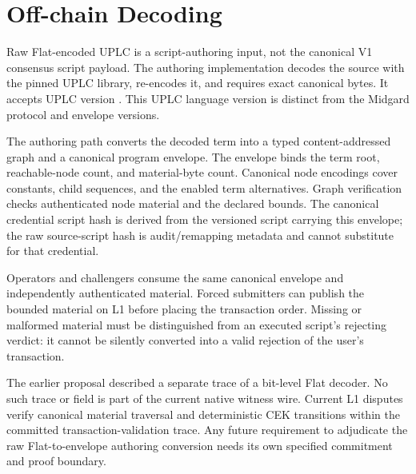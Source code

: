 \documentclass[../midgard.tex]{subfiles}
\begin{document}
\section{Off-chain Decoding}
\label{s:phase-two-decoding-off-chain}

Raw Flat-encoded UPLC is a script-authoring input, not the canonical V1 consensus script payload. The authoring implementation decodes the source with the pinned UPLC library, re-encodes it, and requires exact canonical bytes. It accepts UPLC version . This UPLC language version is distinct from the Midgard protocol and envelope versions.

The authoring path converts the decoded term into a typed content-addressed graph and a canonical program envelope. The envelope binds the term root, reachable-node count, and material-byte count. Canonical node encodings cover constants, child sequences, and the enabled term alternatives. Graph verification checks authenticated node material and the declared bounds. The canonical credential script hash is derived from the versioned script carrying this envelope; the raw source-script hash is audit/remapping metadata and cannot substitute for that credential.

Operators and challengers consume the same canonical envelope and independently authenticated material. Forced submitters can publish the bounded material on L1 before placing the transaction order. Missing or malformed material must be distinguished from an executed script's rejecting verdict: it cannot be silently converted into a valid rejection of the user's transaction.

The earlier  proposal described a separate trace of a bit-level Flat decoder. No such trace or  field is part of the current native witness wire. Current L1 disputes verify canonical material traversal and deterministic CEK transitions within the committed transaction-validation trace. Any future requirement to adjudicate the raw Flat-to-envelope authoring conversion needs its own specified commitment and proof boundary.
\end{document}
